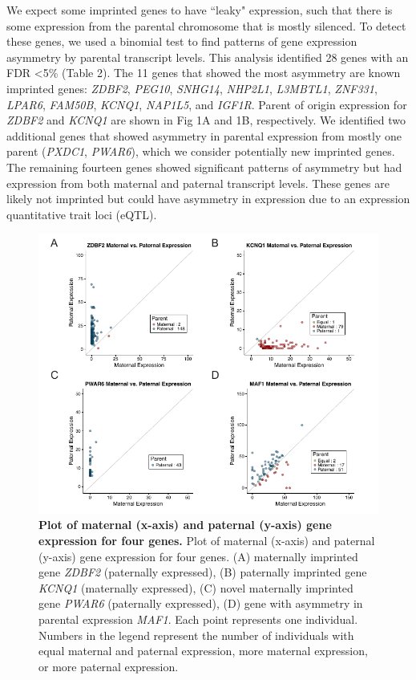 We expect some imprinted genes to have ``leaky" expression, such that there is some expression from the parental chromosome that is mostly silenced. To detect these genes, we used a binomial test to find patterns of gene expression asymmetry by parental transcript levels.  This analysis identified 28 genes with an FDR \textless5\% (Table 2). The 11 genes that showed the most asymmetry are known imprinted genes: \emph{ZDBF2}, \emph{PEG10}, \emph{SNHG14}, \emph{NHP2L1}, \emph{L3MBTL1}, \emph{ZNF331}, \emph{LPAR6}, \emph{FAM50B}, \emph{KCNQ1}, \emph{NAP1L5}, and \emph{IGF1R}. Parent of origin expression for \emph{ZDBF2} and \emph{KCNQ1} are shown in Fig 1A and 1B, respectively. We identified two additional genes that showed asymmetry in parental expression from mostly one parent (\emph{PXDC1}, \emph{PWAR6}), which we consider potentially new imprinted genes. The remaining fourteen genes showed significant patterns of asymmetry but had expression from both maternal and paternal transcript levels. These genes are likely not imprinted but could have asymmetry in expression due to an expression quantitative trait loci (eQTL). 


\begin{figure}[!htb]
\centering \includegraphics[width=7in]{img/ch03/fig-01.pdf}
\caption[Plot of maternal (x-axis) and paternal (y-axis) gene expression for four genes.]{\textbf{Plot of maternal (x-axis) and paternal (y-axis) gene expression for four genes.} Plot of maternal (x-axis) and paternal (y-axis) gene expression for four genes. (A) maternally imprinted gene \emph{ZDBF2} (paternally expressed), (B) paternally imprinted gene \emph{KCNQ1} (maternally expressed), (C) novel maternally imprinted gene \emph{PWAR6} (paternally expressed), (D) gene with asymmetry in parental expression \emph{MAF1}. Each point represents one individual. Numbers in the legend represent the number of individuals with equal maternal and paternal expression, more maternal expression, or more paternal expression.}
\label{fig:matpatexpression}
\end{figure}


